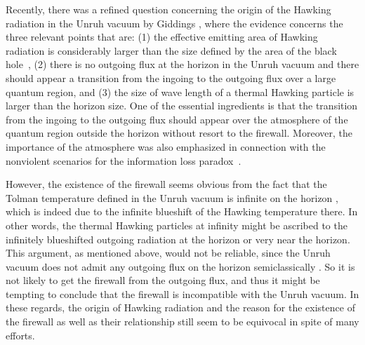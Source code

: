 \documentclass[aps,preprint,a4paper,showpacs,showkeys,superscriptaddress]{revtex4-1}
\begin{document}
Recently,
there was a refined question concerning the origin of the Hawking radiation in the Unruh vacuum
by Giddings \cite{Giddings:2015uzr},
where the evidence concerns the three relevant points that are: (1) the effective emitting area of Hawking radiation is
considerably larger than the size defined by the area of the black hole~\cite{Page:1976df},
(2) there is no outgoing flux at the horizon in the Unruh vacuum
and there should appear a transition from the ingoing to the outgoing flux
over a large quantum region, and
(3) the size of wave length of a thermal Hawking particle is larger than
the horizon size.
One of the essential ingredients is that
the transition from the ingoing to the outgoing flux should appear over the atmosphere of
the quantum region outside the horizon
without resort to the firewall.
Moreover, the importance of
the atmosphere
was also emphasized in connection with the nonviolent scenarios
for the information loss paradox~\cite{Giddings:2006sj}.

However, the existence of the firewall seems obvious
from the fact that the Tolman temperature defined in the Unruh vacuum
is infinite on the horizon \cite{Tolman:1930zza},
which is indeed due to the infinite blueshift of the Hawking temperature there.
In other words, the thermal Hawking particles at infinity
might be ascribed to the infinitely blueshifted outgoing radiation at the horizon or very
near the horizon.
This argument, as mentioned above, would not be reliable, since the Unruh vacuum
does not admit any outgoing flux on the horizon semiclassically \cite{Unruh:1976db}.
So it is not likely to get the firewall from the outgoing flux, and thus
it might be tempting to conclude
that the firewall is incompatible with the Unruh vacuum.
In these regards, the origin of Hawking radiation and the reason for the
existence of the firewall as well as their relationship
still seem to be equivocal in spite of many efforts.
\end{document}
